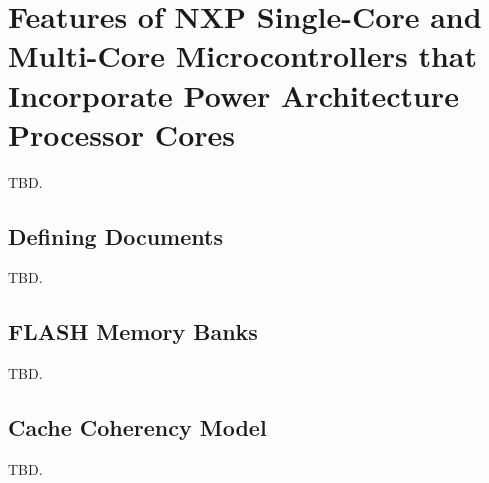 \section{Features of NXP\textsuperscript{\textregistered} Single-Core and
         Multi-Core Microcontrollers that Incorporate
         Power Architecture\textsuperscript{\textregistered} Processor Cores}
\label{sndv0}

TBD.


\subsection{Defining Documents}
\label{sndv0:sddo0}

TBD.


\subsection{FLASH Memory Banks}
\label{sndv0:sfmb0}

TBD.


\subsection{Cache Coherency Model}
\label{sndv0:sccm0}

TBD.
